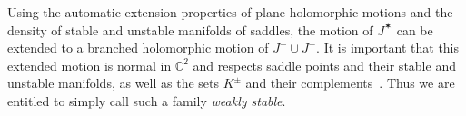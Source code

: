 \documentclass[11pt, oneside]{amsart}
\newcommand{\C}{\mathbb{C}}
\newcommand{\jstar}{J^\varstar}
\theoremstyle{remark}
\theoremstyle{definition}
\theoremstyle{theorem}
\begin{document}
Using the automatic extension properties of plane holomorphic motions and the density of  
  stable and unstable manifolds of saddles, the motion of $\jstar$ can be extended to a branched holomorphic motion of $J^+\cup J^-$. It is   important   that this extended motion is normal in $\C^2$ and respects saddle points and their 
   stable and unstable manifolds, as well as  the sets $K^\pm$ and their complements~\cite[Lem. 5.10, Thm. 5.12 and Cor. 5.14]{tangencies}.  Thus we are entitled to simply call such a  family \emph{weakly stable}. 

 

\end{document}
